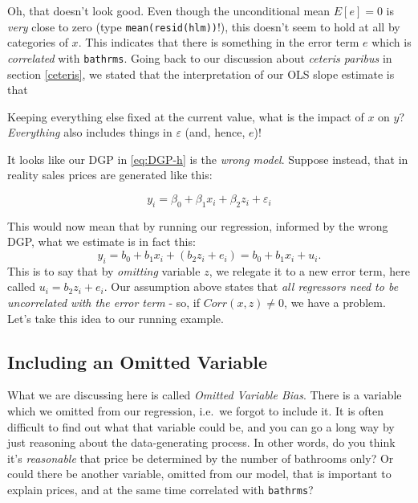 \documentclass[]{book}
\newenvironment{tip}{\begin{tcolorbox}[colback=green!5!white,colframe=green]}{\end{tcolorbox}}
\begin{document}
Oh, that doesn't look good. Even though the unconditional mean
\(E[e] = 0\) is \emph{very} close to zero (type
\texttt{mean(resid(hlm))}!), this doesn't seem to hold at all by
categories of \(x\). This indicates that there is something in the error
term \(e\) which is \emph{correlated} with \texttt{bathrms}. Going back
to our discussion about \emph{ceteris paribus} in section \ref{ceteris},
we stated that the interpretation of our OLS slope estimate is that

\begin{tip}
Keeping everything else fixed at the current value, what is the impact
of \(x\) on \(y\)? \emph{Everything} also includes things in
\(\varepsilon\) (and, hence, \(e\))!
\end{tip}

 It looks like our DGP in \eqref{eq:DGP-h} is the \emph{wrong model}.
Suppose instead, that in reality sales prices are generated like this:

\begin{equation}
y_i = \beta_0 + \beta_1 x_i + \beta_2 z_i + \varepsilon_i \label{eq:DGP-h2}
\end{equation}

This would now mean that by running our regression, informed by the
wrong DGP, what we estimate is in fact this: \[
y_i = b_0 + b_1 x_i + (b_2 z_i + e_i)  = b_0 + b_1 x_i + u_i.
\] This is to say that by \emph{omitting} variable \(z\), we relegate it
to a new error term, here called \(u_i = b_2 z_i + e_i\). Our assumption
above states that \emph{all regressors need to be uncorrelated with the
error term} - so, if \(Corr(x,z)\neq 0\), we have a problem. Let's take
this idea to our running example.

\subsection{Including an Omitted
Variable}\label{including-an-omitted-variable}

What we are discussing here is called \emph{Omitted Variable Bias}.
There is a variable which we omitted from our regression, i.e.~we forgot
to include it. It is often difficult to find out what that variable
could be, and you can go a long way by just reasoning about the
data-generating process. In other words, do you think it's
\emph{reasonable} that price be determined by the number of bathrooms
only? Or could there be another variable, omitted from our model, that
is important to explain prices, and at the same time correlated with
\texttt{bathrms}?
\end{document}
